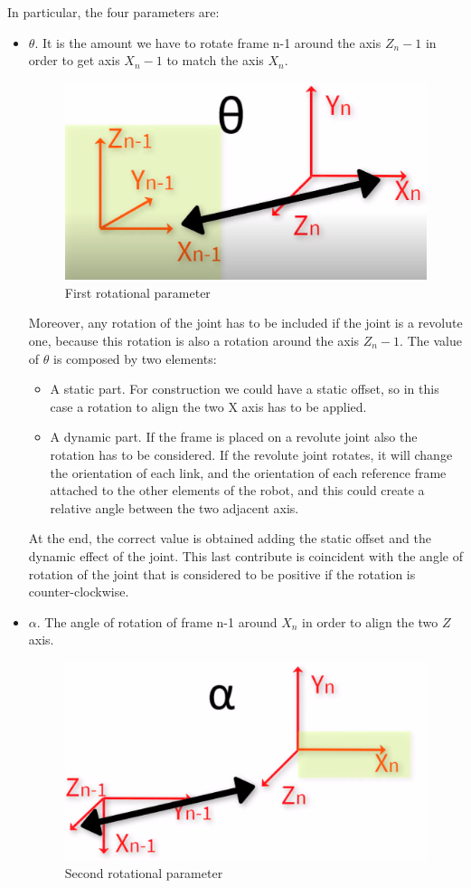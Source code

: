 In particular, the four parameters are:
\begin{itemize}
    \item \textbf{$\theta$}. It is the amount we have to rotate frame n-1 around the axis $Z_n -1$ in order to get axis $X_n -1$ to match the axis $X_n$. 
    
    \begin{figure}[!h]
    \begin{center}
    \includegraphics[width=0.5\linewidth]{capitolo3/figure/theta.png}
    \caption{First rotational parameter}
    \label{fig:theta}
    \end{center}
    \end{figure}

    Moreover, any rotation of the joint has to be included if the joint is a revolute one, because this rotation is also a rotation around the axis $Z_n -1$. The value of $\theta$ is composed by two elements:
    \begin{itemize}
        \item A static part. For construction we could have a static offset, so in this case a rotation to align the two X axis has to be applied.
        \item A dynamic part. If the frame is placed on a revolute joint also the rotation has to be considered. If the revolute joint rotates, it will change the orientation of each link, and the orientation of each reference frame attached to the other elements of the robot, and this could create a relative angle between the two adjacent axis.
    \end{itemize}
 
     At the end, the correct value is obtained adding the static offset and the dynamic effect of the joint. This last contribute is coincident with the angle of rotation of the joint that is considered to be positive if the rotation is counter-clockwise.
 
    \item \textbf{$\alpha$}. The angle of rotation of frame n-1 around $X_n$ in order to align the two $Z$ axis.
    
    \begin{figure}[!h]
    \begin{center}
    \includegraphics[width=0.5\linewidth]{capitolo3/figure/alpha.png}
    \caption{Second rotational parameter}
    \label{fig:alpha}
    \end{center}
    \end{figure}
    

\end{itemize}
